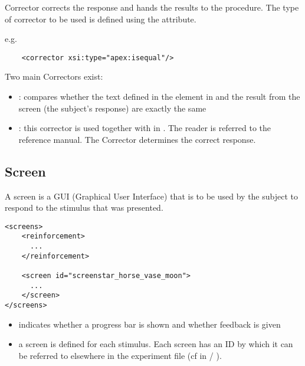 Corrector corrects the response and hands the results to the
procedure. The type of corrector to be used is defined using the  attribute.

e.g.

\begin{lstlisting}
    <corrector xsi:type="apex:isequal"/>
\end{lstlisting}

Two main Correctors exist:
\begin{itemize}\item {}: compares whether the text defined in the  element in
 and the result from the screen (the subject's response) are exactly the same

\item {}: this corrector is used together with
 in . The
reader is referred to the reference manual. The Corrector
determines the correct response.
\end{itemize}

\label{sec:Corrector}

\subsection{Screen}
\label{sec:screen}


\begin{description} \item A screen is a GUI (Graphical User Interface) that is to be used by the subject to
respond to the stimulus that was presented.
\end{description}

\begin{lstlisting}
<screens>
    <reinforcement>
      ...
    </reinforcement>

    <screen id="screenstar_horse_vase_moon">
      ...
    </screen>
</screens>
\end{lstlisting}

\begin{itemize}
\item {} indicates whether a progress bar is
shown and whether feedback is given

\item {} a screen is defined for each stimulus. Each
screen has an ID by which it can be referred to elsewhere in the
experiment file (cf in / ).

\end{itemize}


